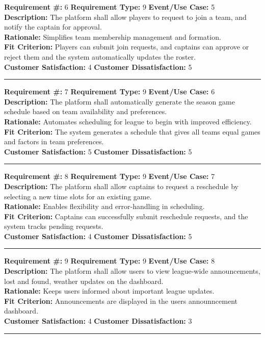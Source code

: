 \documentclass[12pt]{article}
\begin{document}
\textbf{Requirement \#:} 6 \quad \textbf{Requirement Type:} 9 \quad \textbf{Event/Use Case:} 5 \\
\textbf{Description:} The platform shall allow players to request to join a team, and notify the captain for approval.\\
\textbf{Rationale:} Simplifies team membership management and formation.\\
\textbf{Fit Criterion:} Players can submit join requests, and captains can approve or reject them and the system automatically updates the roster.\\
\textbf{Customer Satisfaction:} 4 \quad\quad \textbf{Customer Dissatisfaction:} 5\\
\noindent\rule{\textwidth}{1pt}

\textbf{Requirement \#:} 7 \quad \textbf{Requirement Type:} 9 \quad \textbf{Event/Use Case:} 6 \\
\textbf{Description:} The platform shall automatically generate the season game schedule based on team availability and preferences.\\
\textbf{Rationale:} Automates scheduling for league to begin with improved efficiency.\\
\textbf{Fit Criterion:} The system generates a schedule that gives all teams equal games and factors in team preferences.\\
\textbf{Customer Satisfaction:} 5 \quad\quad \textbf{Customer Dissatisfaction:} 5\\
\noindent\rule{\textwidth}{1pt}

\textbf{Requirement \#:} 8 \quad \textbf{Requirement Type:} 9 \quad \textbf{Event/Use Case:} 7 \\
\textbf{Description:} The platform shall allow captains to request a reschedule by selecting a new time slots for an existing game.\\
\textbf{Rationale:} Enables flexibility and error-handling in scheduling.\\
\textbf{Fit Criterion:} Captains can successfully submit reschedule requests, and the system tracks pending requests.\\
\textbf{Customer Satisfaction:} 4 \quad\quad \textbf{Customer Dissatisfaction:} 5\\
\noindent\rule{\textwidth}{1pt}

\textbf{Requirement \#:} 9 \quad \textbf{Requirement Type:} 9 \quad \textbf{Event/Use Case:} 8 \\
\textbf{Description:} The platform shall allow users to view league-wide announcements, lost and found, weather updates on the dashboard.\\
\textbf{Rationale:} Keeps users informed about important league updates. \\
\textbf{Fit Criterion:} Announcements are displayed in the users announncement dashboard.\\
\textbf{Customer Satisfaction:} 4 \quad\quad \textbf{Customer Dissatisfaction:} 3\\
\noindent\rule{\textwidth}{1pt}
\end{document}
